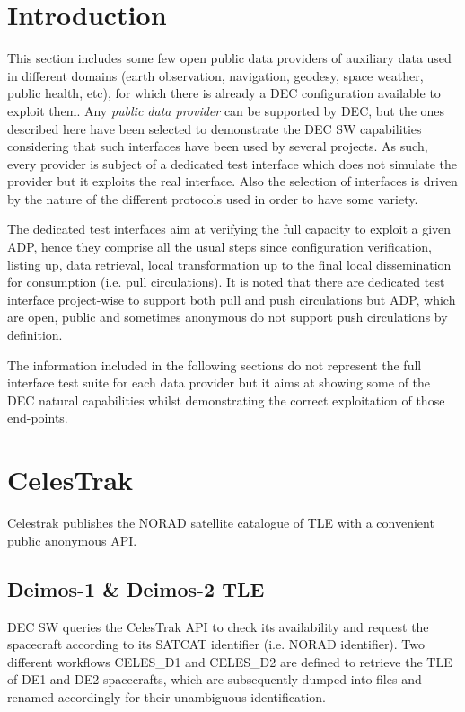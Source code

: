 \documentclass[dec_sum_main.tex]{subfiles}
\begin{document}
\label{Public Data Providers}

\section{Introduction}
 
This section includes some few open public data providers of auxiliary data used in different domains (earth observation, navigation, geodesy, space weather, public health, etc), for which there is already a DEC configuration available to exploit them. Any \textit{public data provider} can be supported by DEC, but the ones described here have been selected to demonstrate the DEC SW capabilities considering that such interfaces have been used by several projects. As such, every provider is subject of a dedicated test interface which does not simulate the provider but it exploits the real interface. Also the selection of interfaces is driven by the nature of the different protocols used in order to have some variety.\newline

\par
\noindent
The dedicated test interfaces aim at verifying the full capacity to exploit a given ADP, hence they comprise all the usual steps since configuration verification, listing up, data retrieval, local transformation up to the final local dissemination for consumption (i.e. pull circulations). It is noted that there are dedicated test interface project-wise to support both pull and push circulations but ADP, which are open, public and sometimes anonymous do not support push circulations by definition.\newline

\par
\noindent
The information included in the following sections do not represent the full interface test suite for each data provider but it aims at showing some of the DEC natural capabilities whilst demonstrating the correct exploitation of those end-points.

\pagebreak

\section{CelesTrak }
Celestrak publishes the NORAD satellite catalogue of TLE with a convenient public anonymous API.\newline  

\subsection{Deimos-1 \& Deimos-2 TLE }
DEC SW queries the CelesTrak API to check its availability and request the spacecraft according to its SATCAT identifier (i.e. NORAD identifier). Two different workflows CELES\_D1 and CELES\_D2 are defined to retrieve the TLE of DE1 and DE2 spacecrafts, which are subsequently dumped into files and renamed accordingly for their unambiguous identification.\newline
	
\end{document}
